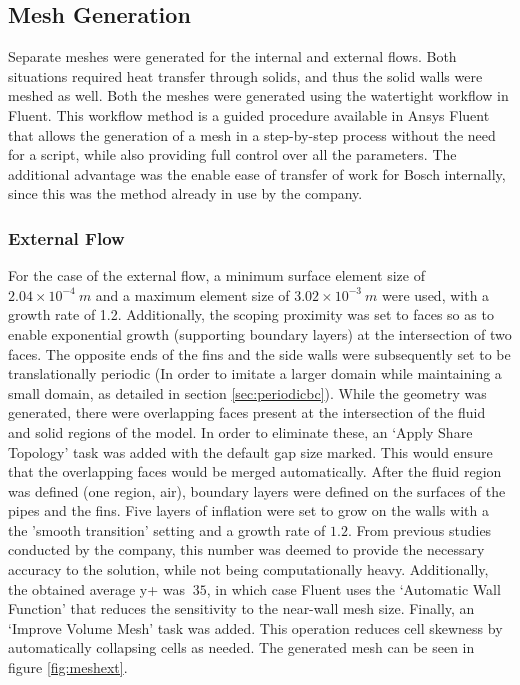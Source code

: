\documentclass[11pt,a4paper,twoside,oneside]{article}
\begin{document}
\subsection{Mesh Generation}
\vspace{0.3cm}
Separate meshes were generated for the internal and external flows. Both situations required heat transfer through solids, and thus the solid walls were meshed as well. Both the meshes were generated using the watertight workflow in Fluent. This workflow method is a guided procedure available in Ansys Fluent that allows the generation of a mesh in a step-by-step process without the need for a script, while also providing full control over all the parameters. The additional advantage was the enable ease of transfer of work for Bosch internally, since this was the method already in use by the company.

\subsubsection{External Flow}
\vspace{0.3cm}
For the case of the external flow, a minimum surface element size of $2.04\times 10^{-4}\ m$ and a maximum element size of $3.02\times 10^{-3}\ m$ were used, with a growth rate of 1.2. Additionally, the scoping proximity was set to faces so as to enable exponential growth (supporting boundary layers) at the intersection of two faces. The opposite ends of the fins and the side walls were subsequently set to be translationally periodic (In order to imitate a larger domain while maintaining a small domain, as detailed in section \ref{sec:periodicbc}). While the geometry was generated, there were overlapping faces present at the intersection of the fluid and solid regions of the model. In order to eliminate these, an `Apply Share Topology' task was added with the default gap size marked. This would ensure that the overlapping faces would be merged automatically. After the fluid region was defined (one region, air), boundary layers were defined on the surfaces of the pipes and the fins. Five layers of inflation were set to grow on the walls with a the 'smooth transition' setting and a growth rate of $1.2$. From previous studies conducted by the company, this number was deemed to provide the necessary accuracy to the solution, while not being computationally heavy. Additionally, the obtained average y+ was $~35$, in which case Fluent uses the `Automatic Wall Function' that reduces the sensitivity to the near-wall mesh size\cite{flug}. Finally, an `Improve Volume Mesh' task was added. This operation reduces cell skewness by automatically collapsing cells as needed. The generated mesh can be seen in figure \ref{fig:meshext}.
\end{document}
